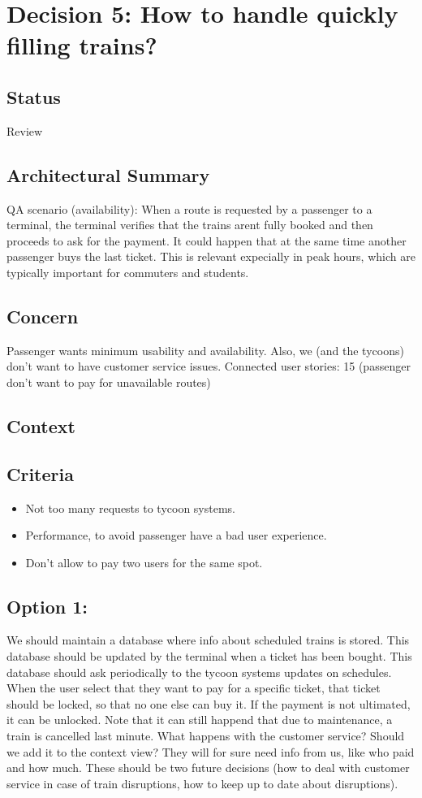 \section*{Decision 5: How to handle quickly filling trains?}

\subsection*{Status}
Review

\subsection*{Architectural Summary}
QA scenario (availability): When a route is requested by a passenger to a terminal, the terminal verifies that the trains arent fully booked and then proceeds to
ask for the payment.
It could happen that at the same time another passenger buys the last ticket. This is relevant expecially in peak hours, which are typically important for commuters and students.

\subsection*{Concern}
Passenger wants minimum usability and availability. Also, we (and the tycoons) don't want to have customer service issues.
Connected user stories: 15 (passenger don't want to pay for unavailable routes)

\subsection*{Context}


\subsection*{Criteria}
\begin{itemize}
\item Not too many requests to tycoon systems.
\item Performance, to avoid passenger have a bad user experience.
\item Don't allow to pay two users for the same spot.
\end{itemize}

\subsection*{Option 1: }
We should maintain a database where info about scheduled trains is stored. 
This database should be updated by the terminal when a ticket has been bought.
This database should ask periodically to the tycoon systems updates on schedules.
When the user select that they want to pay for a specific ticket, that ticket should be locked, so that no one else can buy it. 
If the payment is not ultimated, it can be unlocked.
Note that it can still happend that due to maintenance, a train is cancelled last minute. 
What happens with the customer service? Should we add it to the context view? They will for sure need info from us, like who paid and how much. 
These should be two future decisions (how to deal with customer service in case of train disruptions, how to keep up to date about disruptions).

